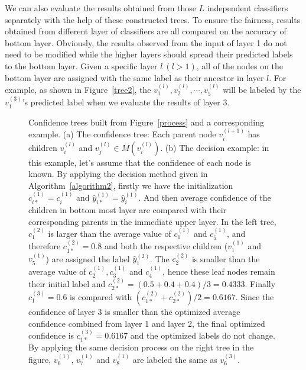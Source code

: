 \documentclass[letterpaper, 10 pt, conference]{ieeeconf}  %
\begin{document}
We can also evaluate the results obtained from those $L$ independent classifiers separately with the help of these constructed trees. To ensure the fairness, results obtained from different layer of classifiers are all compared on the accuracy of bottom layer. Obviously, the results observed from the input of layer 1 do not need to be modified while the higher layers should spread their predicted labels to the bottom layer. Given a specific layer $l~(l>1)$, all of the nodes on the bottom layer are assigned with the same label as their ancestor in layer $l$. For example, as shown in Figure~\ref{tree2}, the $v_1^{(l)},v_2^{(l)},\cdots,v_5^{(l)}$ will be labeled by the $v_1^{(3)}$'s predicted label when we evaluate the results of layer 3.


\begin{figure}[tpb]
\centering
{}
\caption{Confidence trees built from Figure~\ref{process} and a corresponding example. (a) The confidence tree: Each parent node $v_i^{(l+1)}$ has children $v_i^{(l)}$ and $v_j^{(l)}\in M(v_i^{(l)})$. (b) The decision example: in this example, let's assume that the confidence of each node is known. By applying the decision method given in Algorithm~\ref{algorithm2}, firstly we have the initialization $c_{i*}^{(1)} = c_i^{(1)}$ and $\hat{y}_{i*}^{(1)} = \hat{y}_i^{(1)}$. And then average confidence of the children in bottom most layer are compared with their corresponding parents in the immediate upper layer. In the left tree, $c_1^{(2)}$ is larger than the average value of $c_1^{(1)}$ and $c_5^{(1)}$, and therefore $c_{1*}^{(2)}=0.8$ and both the respective children ($v_1^{(1)}$ and $v_5^{(1)}$) are assigned the label $\hat{y}_{1}^{(2)}$. The $c_2^{(2)}$  is smaller than the average value of $c_2^{(1)},c_3^{(1)}$ and $c_4^{(1)}$, hence these leaf nodes remain their initial label and $c_{2*}^{(2)}=(0.5+0.4+0.4)/3=0.4333$. Finally $c_1^{(3)}=0.6$ is compared with $(c_{1*}^{(2)}+c_{2*}^{(2)})/2=0.6167$. Since the confidence of layer 3 is smaller than the optimized average confidence combined from layer 1 and layer 2, the final optimized confidence is $c_{1*}^{(3)}=0.6167$ and the optimized labels do not change. By applying the same decision process on the right tree in the figure, $v_6^{(1)}$, $v_7^{(1)}$ and $v_8^{(1)}$ are labeled the same as $v_6^{(3)}$.}
\label{tree}
\end{figure}
\end{document}
